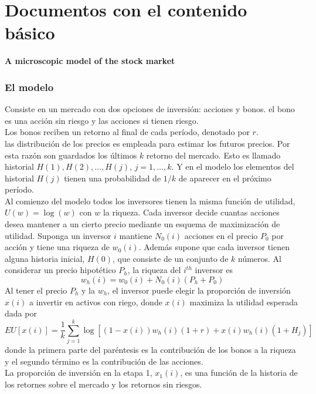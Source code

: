 \documentclass[12pt,a4paper]{article}
\begin{document}
\part{Documentos con el contenido básico}
\begin{center}
\textbf{A microscopic model of the stock market}\citep{Levy1994}
\end{center}
\citep{li2007}
\section{El modelo}
\quad Consiste en un mercado con dos opciones de inversión: acciones  y bonos. el bono es una acción sin riesgo y las acciones si tienen riesgo.\\
\quad Los bonos reciben un retorno al final de cada período, denotado por $r$. \\
\quad las distribución de los precios es empleada para estimar los futuros precios. Por esta razón son guardados los últimos $k$ retorno del mercado. Esto es llamado historial $H(1),H(2),\dots ,H(j)$, $j = 1,\dots ,k$. Y en el modelo los elementos del historial $H(j)$ tienen una probabilidad de $1/k$ de aparecer en el próximo período.\\
\quad Al comienzo del modelo todos los inversores tienen la misma función de utilidad, $U(w)=\log(w)$ con $w$ la riqueza. Cada inversor decide cuantas acciones desea mantener a un cierto precio mediante un esquema de maximización de utilidad. Suponga un inversor $i$ mantiene $N_0(i)$ acciones en el precio $P_0$ por acción y tiene una riqueza de $w_0(i)$. Además supone que cada inversor tienen alguna historia inicial, $H(0)$, que consiste de un conjunto de $k$ números. Al considerar un precio hipotético $P_h$, la riqueza del $i^{th}$ inversor es
\begin{equation}
w_h(i) = w_0(i) + N_0(i)(P_h+P_0) 
\end{equation}
Al tener el precio $P_h$ y la $w_h$, el inversor puede elegir la proporción de inversión $x(i)$ a invertir en activos con riego, donde $x(i)$ maximiza la utilidad esperada dada por 
\begin{equation}
EU[x(i)] = \frac{1}{k} \sum^{k}_{j=1} \log[(1-x(i))w_h(i)(1+r)+x(i)w_h(i)(1+H_j)]
\end{equation}
donde la primera parte del paréntesis es la contribución de los bonos a la riqueza y el segundo término es la contribución de las acciones.\\
\quad La proporción de inversión en la etapa 1, $x_1(i)$, es una función de la historia de los retornes sobre el mercado y los retornos sin riesgos.\\
\end{document}
